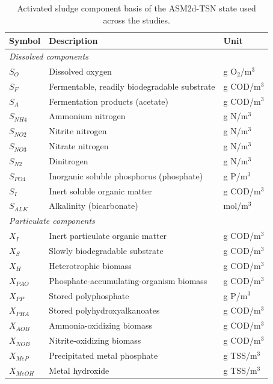 \documentclass[12pt, twoside]{book}
\begin{document}
\begin{table}[htbp]
\centering
\caption{Activated sludge component basis of the ASM2d-TSN state used across the studies.}
\label{tab:appA_components}
\small
\setlength{\tabcolsep}{6pt}
\begin{tabular}{l p{7.0cm} l}
\toprule
Symbol & Description & Unit \\
\midrule
\multicolumn{3}{l}{\textit{Dissolved components}}\\
$S_O$ & Dissolved oxygen & g O$_2$/m$^3$ \\
$S_F$ & Fermentable, readily biodegradable substrate & g COD/m$^3$ \\
$S_A$ & Fermentation products (acetate) & g COD/m$^3$ \\
$S_{NH4}$ & Ammonium nitrogen & g N/m$^3$ \\
$S_{NO2}$ & Nitrite nitrogen & g N/m$^3$ \\
$S_{NO3}$ & Nitrate nitrogen & g N/m$^3$ \\
$S_{N2}$ & Dinitrogen & g N/m$^3$ \\
$S_{PO4}$ & Inorganic soluble phosphorus (phosphate) & g P/m$^3$ \\
$S_I$ & Inert soluble organic matter & g COD/m$^3$ \\
$S_{ALK}$ & Alkalinity (bicarbonate) & mol/m$^3$ \\
\midrule
\multicolumn{3}{l}{\textit{Particulate components}}\\
$X_I$ & Inert particulate organic matter & g COD/m$^3$ \\
$X_S$ & Slowly biodegradable substrate & g COD/m$^3$ \\
$X_H$ & Heterotrophic biomass & g COD/m$^3$ \\
$X_{PAO}$ & Phosphate-accumulating-organism biomass & g COD/m$^3$ \\
$X_{PP}$ & Stored polyphosphate & g P/m$^3$ \\
$X_{PHA}$ & Stored polyhydroxyalkanoates & g COD/m$^3$ \\
$X_{AOB}$ & Ammonia-oxidizing biomass & g COD/m$^3$ \\
$X_{NOB}$ & Nitrite-oxidizing biomass & g COD/m$^3$ \\
$X_{MeP}$ & Precipitated metal phosphate & g TSS/m$^3$ \\
$X_{MeOH}$ & Metal hydroxide & g TSS/m$^3$ \\
\bottomrule
\end{tabular}
\end{table}
\end{document}
